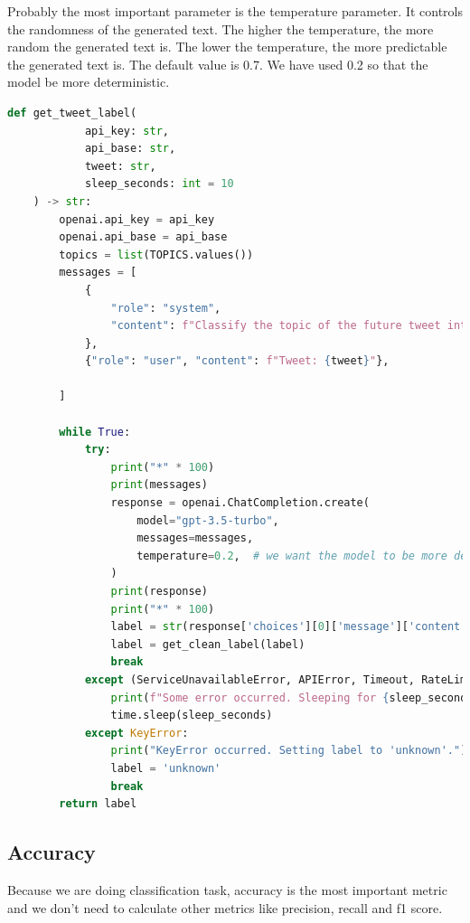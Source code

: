 \documentclass[12pt, letterpaper]{article}
\begin{document}
    Probably the most important parameter is the temperature parameter. It controls the randomness of the generated text. The higher the temperature, the more random the generated text is. The lower the temperature, the more predictable the generated text is. The default value is 0.7. We have used 0.2 so that the model be more deterministic.
    \begin{lstlisting}[language=Python]
    def get_tweet_label(
            api_key: str,
            api_base: str,
            tweet: str,
            sleep_seconds: int = 10
    ) -> str:
        openai.api_key = api_key
        openai.api_base = api_base
        topics = list(TOPICS.values())
        messages = [
            {
                "role": "system",
                "content": f"Classify the topic of the future tweet into only one of the following categories: {', '.join(topics)}. some of these tweets are in slang persian language. please try to understand them. Just type the topic and nothing else."
            },
            {"role": "user", "content": f"Tweet: {tweet}"},
    
        ]
    
        while True:
            try:
                print("*" * 100)
                print(messages)
                response = openai.ChatCompletion.create(
                    model="gpt-3.5-turbo",
                    messages=messages,
                    temperature=0.2,  # we want the model to be more deterministic
                )
                print(response)
                print("*" * 100)
                label = str(response['choices'][0]['message']['content']).strip()
                label = get_clean_label(label)
                break
            except (ServiceUnavailableError, APIError, Timeout, RateLimitError):
                print(f"Some error occurred. Sleeping for {sleep_seconds} seconds and trying again")
                time.sleep(sleep_seconds)
            except KeyError:
                print("KeyError occurred. Setting label to 'unknown'.")
                label = 'unknown'
                break
        return label
    \end{lstlisting}

    \subsection{Accuracy}\label{subsec:accuracy-openai}
    Because we are doing classification task, accuracy is the most important metric and we don't need to calculate other metrics like precision, recall and f1 score.
    
\end{document}
